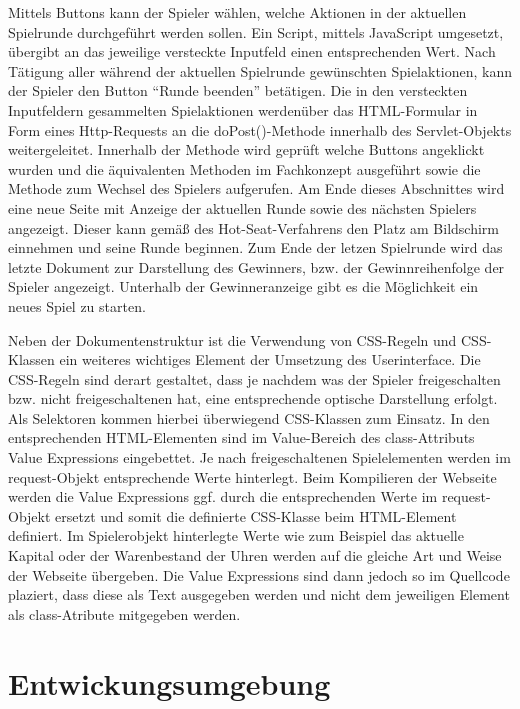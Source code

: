 Mittels Buttons kann der Spieler wählen, welche Aktionen in der aktuellen Spielrunde durchgeführt werden sollen. Ein Script, mittels JavaScript umgesetzt, übergibt an das jeweilige versteckte Inputfeld einen entsprechenden Wert.
Nach Tätigung aller während der aktuellen Spielrunde gewünschten Spielaktionen, kann der Spieler den Button \enquote{Runde beenden} betätigen. Die in den versteckten Inputfeldern gesammelten Spielaktionen werdenüber das HTML-Formular in Form eines Http-Requests an die doPost()-Methode innerhalb des Servlet-Objekts weitergeleitet. Innerhalb der Methode wird geprüft welche Buttons angeklickt wurden und die äquivalenten Methoden im Fachkonzept ausgeführt sowie die Methode zum Wechsel des Spielers aufgerufen. Am Ende dieses Abschnittes wird eine neue Seite mit Anzeige der aktuellen Runde sowie des nächsten Spielers angezeigt. Dieser kann gemäß des Hot-Seat-Verfahrens den Platz am Bildschirm einnehmen und seine Runde beginnen. Zum Ende der letzen Spielrunde wird das letzte Dokument zur Darstellung des Gewinners, bzw. der Gewinnreihenfolge der Spieler angezeigt. Unterhalb der Gewinneranzeige gibt es die Möglichkeit ein neues Spiel zu starten.

Neben der Dokumentenstruktur ist die Verwendung von CSS-Regeln und CSS-Klassen ein weiteres wichtiges Element der Umsetzung des Userinterface. Die CSS-Regeln sind derart gestaltet, dass je nachdem was der Spieler freigeschalten bzw. nicht freigeschaltenen hat, eine entsprechende optische Darstellung erfolgt. Als Selektoren kommen hierbei überwiegend CSS-Klassen zum Einsatz. In den entsprechenden HTML-Elementen sind im Value-Bereich des class-Attributs Value Expressions eingebettet. Je nach freigeschaltenen Spielelementen werden im request-Objekt entsprechende Werte hinterlegt. Beim Kompilieren der Webseite werden die Value Expressions ggf. durch die entsprechenden Werte im request-Objekt ersetzt und somit die definierte CSS-Klasse beim HTML-Element definiert. Im Spielerobjekt hinterlegte Werte wie zum Beispiel das aktuelle Kapital oder der Warenbestand der Uhren werden auf die gleiche Art und Weise der Webseite übergeben. Die Value Expressions sind dann jedoch so im Quellcode plaziert, dass diese als Text ausgegeben werden und nicht dem jeweiligen Element als class-Atribute mitgegeben werden.

\clearpage
\chapter{Entwickungsumgebung}
